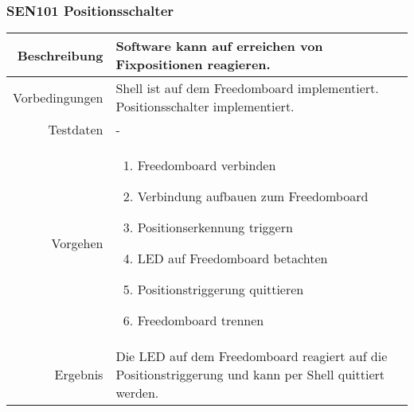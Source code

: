 \subsubsection{SEN101 Positionsschalter}
\begin{table}[h!]
	\renewcommand{\arraystretch}{1.5}
	\begin{tabular}{|r|p{14cm}|}
		\hline Beschreibung	&
			Software kann auf erreichen von Fixpositionen reagieren. \\ 
		\hline Vorbedingungen	&
			Shell ist auf dem Freedomboard implementiert.
			Positionsschalter implementiert. \\ 
		\hline Testdaten	& - \\ 
		\hline Vorgehen		& 
		\begin{enumerate}
			\item Freedomboard verbinden
			\item Verbindung aufbauen zum Freedomboard
			\item Positionserkennung triggern
			\item LED auf Freedomboard betachten
			\item Positionstriggerung quittieren
			\item Freedomboard trennen
		\end{enumerate} \\ 
		\hline Ergebnis 	&
			Die LED auf dem Freedomboard reagiert auf die
			Positionstriggerung und kann per Shell quittiert werden.\\ 
		\hline 
	\end{tabular}
\end{table}



